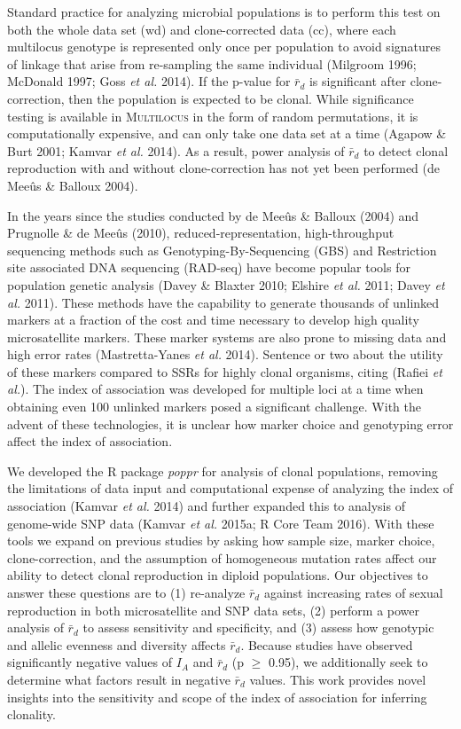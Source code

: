 \documentclass[]{article}
\theoremstyle{definition}
\theoremstyle{definition}
\theoremstyle{remark}
\begin{document}
Standard practice for analyzing microbial populations is to perform this
test on both the whole data set (wd) and clone-corrected data (cc),
where each multilocus genotype is represented only once per population
to avoid signatures of linkage that arise from re-sampling the same
individual (Milgroom 1996; McDonald 1997; Goss \emph{et al.} 2014). If
the p-value for \(\bar{r}_d\) is significant after clone-correction,
then the population is expected to be clonal. While significance testing
is available in \textsc{Multilocus} in the form of random permutations,
it is computationally expensive, and can only take one data set at a
time (Agapow \& Burt 2001; Kamvar \emph{et al.} 2014). As a result,
power analysis of \(\bar{r}_d\) to detect clonal reproduction with and
without clone-correction has not yet been performed (de Meeûs \& Balloux
2004).

In the years since the studies conducted by de Meeûs \& Balloux (2004)
and Prugnolle \& de Meeûs (2010), reduced-representation,
high-throughput sequencing methods such as Genotyping-By-Sequencing
(GBS) and Restriction site associated DNA sequencing (RAD-seq) have
become popular tools for population genetic analysis (Davey \& Blaxter
2010; Elshire \emph{et al.} 2011; Davey \emph{et al.} 2011). These
methods have the capability to generate thousands of unlinked markers at
a fraction of the cost and time necessary to develop high quality
microsatellite markers. These marker systems are also prone to missing
data and high error rates (Mastretta-Yanes \emph{et al.} 2014). Sentence
or two about the utility of these markers compared to SSRs for highly
clonal organisms, citing (Rafiei \emph{et al.}). The index of
association was developed for multiple loci at a time when obtaining
even 100 unlinked markers posed a significant challenge. With the advent
of these technologies, it is unclear how marker choice and genotyping
error affect the index of association.

We developed the R package \emph{poppr} for analysis of clonal
populations, removing the limitations of data input and computational
expense of analyzing the index of association (Kamvar \emph{et al.}
2014) and further expanded this to analysis of genome-wide SNP data
(Kamvar \emph{et al.} 2015a; R Core Team 2016). With these tools we
expand on previous studies by asking how sample size, marker choice,
clone-correction, and the assumption of homogeneous mutation rates
affect our ability to detect clonal reproduction in diploid populations.
Our objectives to answer these questions are to (1) re-analyze
\(\bar{r}_d\) against increasing rates of sexual reproduction in both
microsatellite and SNP data sets, (2) perform a power analysis of
\(\bar{r}_d\) to assess sensitivity and specificity, and (3) assess how
genotypic and allelic evenness and diversity affects \(\bar{r}_d\).
Because studies have observed significantly negative values of \(I_A\)
and \(\bar{r}_d\) (p \(\geq\) 0.95), we additionally seek to determine
what factors result in negative \(\bar{r}_d\) values. This work provides
novel insights into the sensitivity and scope of the index of
association for inferring clonality.
\end{document}
